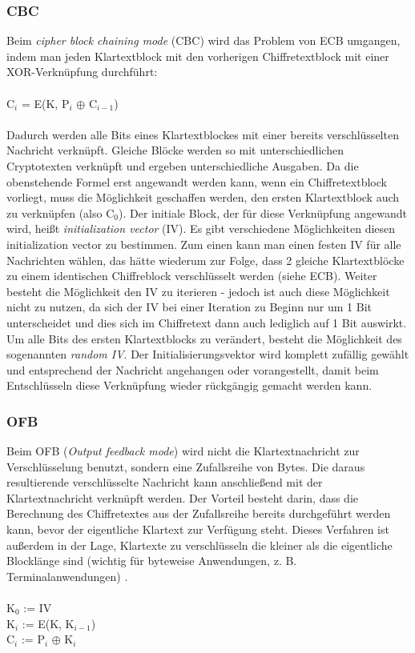 \documentclass[10pt, a4paper,headsepline,pointednumbers]{scrreprt}
\begin{document}
\subsubsection{CBC}
Beim \textit{cipher block chaining mode} (CBC) wird das Problem von ECB umgangen, indem man jeden Klartextblock mit den vorherigen Chiffretextblock mit einer XOR-Verknüpfung durchführt: \\ \\
C$_{i}$ = E(K, P$_{i}$ $\oplus$ C$_{i-1}$) \\ \\
Dadurch werden alle Bits eines Klartextblockes mit einer bereits verschlüsselten Nachricht verknüpft. Gleiche Blöcke werden so mit unterschiedlichen Cryptotexten verknüpft und ergeben unterschiedliche Ausgaben.
Da die obenstehende Formel erst angewandt werden kann, wenn ein Chiffretextblock vorliegt, muss die Möglichkeit geschaffen werden, den ersten Klartextblock auch zu verknüpfen (also C$_{0}$). Der initiale Block, der für diese Verknüpfung angewandt wird, heißt \textit{initialization vector} (IV).
Es gibt verschiedene Möglichkeiten diesen initialization vector zu bestimmen. Zum einen kann man einen festen IV für alle Nachrichten wählen, das hätte wiederum zur Folge, dass 2 gleiche Klartextblöcke zu einem identischen Chiffreblock verschlüsselt werden (siehe ECB). Weiter besteht die Möglichkeit den IV zu iterieren - jedoch ist auch diese Möglichkeit nicht zu nutzen, da sich der IV bei einer Iteration zu Beginn nur um 1 Bit unterscheidet und dies sich im Chiffretext dann auch lediglich auf 1 Bit auswirkt. Um alle Bits des ersten Klartextblocks zu verändert, besteht die Möglichkeit des sogenannten \textit{random IV}. Der Initialisierungsvektor wird komplett zufällig gewählt und entsprechend der Nachricht angehangen oder vorangestellt, damit beim Entschlüsseln diese Verknüpfung wieder rückgängig gemacht werden kann. \citep[S. 227ff]{book:angewandte-krypto}

\subsubsection{OFB}
Beim OFB (\textit{Output feedback mode}) wird nicht die Klartextnachricht zur Verschlüsselung benutzt, sondern eine Zufallsreihe von Bytes. Die daraus resultierende verschlüsselte Nachricht kann anschließend mit der Klartextnachricht verknüpft werden. Der Vorteil besteht darin, dass die Berechnung des Chiffretextes aus der Zufallsreihe bereits durchgeführt werden kann, bevor der eigentliche Klartext zur Verfügung steht. Dieses Verfahren ist außerdem in der Lage, Klartexte zu verschlüsseln die kleiner als die eigentliche Blocklänge sind (wichtig für byteweise Anwendungen, z. B. Terminalanwendungen) \citep[S. 240ff]{book:angewandte-krypto}. \\ \\
K$_{0}$ := IV \\
K$_{i}$ := E(K, K$_{i-1}$) \\
C$_{i}$ := P$_{i}$ $\oplus$ K$_{i}$ \\ \\
\end{document}
